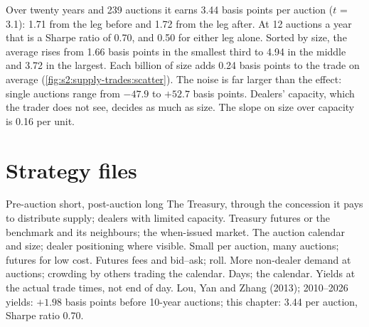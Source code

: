 Over twenty years and 239 auctions it earns 3.44 basis points per auction ($t$ = 3.1): 1.71 from the leg before and 1.72 from the leg after. At 12
auctions a year that is a Sharpe ratio of 0.70, and 0.50 for either leg alone. Sorted by size, the average rises from 1.66 basis points in the
smallest third to 4.94 in the middle and 3.72 in the largest. Each billion of size adds 0.24 basis points to the trade on average
(\cref{fig:s2:supply-trades:scatter}). The noise is far larger than the effect: single auctions range from $-47.9$ to $+52.7$ basis points. Dealers'
capacity, which the trader does not see, decides as much as size. The slope on size over capacity is 0.16 per unit.

\begin{omfigure}

\label{fig:s2:supply-trades:scatter}
\end{omfigure}

\section{Strategy files}

\begin{strategyfile}{Pre-auction short, post-auction long}\label{strat:s2:supply-trades:auction}
 The Treasury, through the concession it pays to distribute supply; dealers with limited capacity.
 Treasury futures or the benchmark and its neighbours; the when-issued market.
 The auction calendar and size; dealer positioning where visible.
 Small per auction, many auctions; futures for low cost.
 Futures fees and bid--ask; roll.
 More non-dealer demand at auctions; crowding by others trading the calendar.
 Days; the calendar.
 Yields at the actual trade times, not end of day.
 Lou, Yan and Zhang (2013); 2010--2026 yields: $+1.98$ basis points before 10-year auctions; this chapter: 3.44 per auction, Sharpe
ratio 0.70.
\end{strategyfile}

